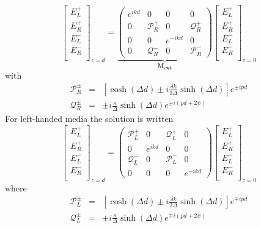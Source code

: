 \begin{equation}
\begin{bmatrix}
E_L^+ \\
E_R^+ \\
E_L^- \\
E_R^- \\
\end{bmatrix}_{z=d} = \underbrace{\begin{pmatrix}
e^{ikd} & 0 & 0 & 0 \\
0 & \mathcal{P}_R^+ & 0 & \mathcal{Q}_R^+ \\
0 & 0 & e^{-ikd} & 0 \\
0 & \mathcal{Q}_R^- & 0 & \mathcal{P}_R^-
\end{pmatrix}}_{\bm{M_{cwt}}}\begin{bmatrix}
E_L^+ \\
E_R^+ \\
E_L^- \\
E_R^- \\
\end{bmatrix}_{z=0} \label{eq:cwt}
\end{equation}
with
\begin{eqnarray}
	\mathcal{P}_R^\pm &=& \left[\cosh(\Delta d) \pm i \frac{\delta k}{2\Delta}\sinh(\Delta d)\right]e^{\pm ipd}\\
\mathcal{Q}_R^\pm &=& \pm i\frac{\kappa}{\Delta}\sinh(\Delta d) e^{\pm i(pd+2\psi)}
\end{eqnarray}
For left-handed media the solution is written
\begin{equation}
\begin{bmatrix}
E_L^+ \\
E_R^+ \\
E_L^- \\
E_R^- \\
\end{bmatrix}_{z=d} = \begin{pmatrix}
	\mathcal{P}^+_L & 0 & \mathcal{Q}_L^+ & 0 \\
	0 & e^{ikd} & 0 & 0 \\
	\mathcal{Q}_L^- & 0 & \mathcal{P}^-_L & 0 \\
	0 & 0 & 0 & e^{-ikd}
	\end{pmatrix}\begin{bmatrix}
E_L^+ \\
E_R^+ \\
E_L^- \\
E_R^- \\
\end{bmatrix}_{z=0} \label{eq:cwt_lh}
\end{equation}
where
\begin{eqnarray}
\mathcal{P}_L^\pm &=& \left[\cosh(\Delta d) \pm i \frac{\delta k}{2\Delta}\sinh(\Delta d)\right]e^{\mp ipd}\\
\mathcal{Q}_L^\pm &=& \pm i\frac{\kappa}{\Delta}\sinh(\Delta d) e^{\mp i(pd+2\psi)}
\end{eqnarray}

